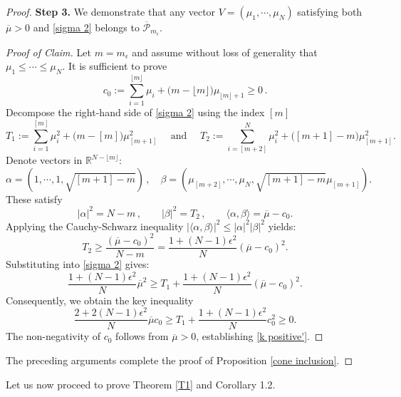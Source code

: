 \documentclass[12pt, twoside]{article}
\theoremstyle{definition}
\numberwithin{equation}{section}
\begin{document}
\begin{proof}
\noindent\textbf{Step 3.} We demonstrate that any vector $V = (\mu_{1}, \cdots, \mu_{N})$ satisfying both $\overline{\mu}>0$ and \eqref{sigma 2} belongs to $\overline{\mathcal{P}}_{m_{\epsilon}}$.
\begin{proof}[Proof of Claim]

Let $m = m_{\epsilon}$ and assume without loss of generality that $\mu_{1} \leq \cdots \leq \mu_{N}$. 
 It is sufficient to prove
\begin{equation}\label{k positive'}
c_{0}:=\sum_{i=1}^{\lfloor m \rfloor}\mu_{i}+\big(m-\lfloor m \rfloor\big)\mu_{\lfloor m \rfloor+1}\geq 0\,.
\end{equation}
Decompose the right-hand side of \eqref{sigma 2} using the index $[m]$
$$T_{1}:=\sum_{i=1}^{[m]}\mu_{i}^{2}+\big(m-[m]\big)\mu_{[m+1]}^{2} \quad \textrm{ and } \quad T_{2}:=\sum_{i=[m+2]}^{N}\mu_{i}^{2}+\big([m+1]-m\big)\mu_{[m+1]}^{2}.$$
Denote vectors in $\mathbb{R}^{N - \lfloor m \rfloor}$:
$$ \alpha=(1,\cdots,1,\sqrt{[m+1]-m})\,, \quad \beta=(\mu_{[m+2]}, \cdots, \mu_{N}, \sqrt{[m+1]-m}\mu_{[m+1]}).$$ 
These satisfy
$$|\alpha|^2=N-m\,, \qquad |\beta|^2=T_{2}\,, \qquad \langle \alpha,\beta\rangle=\overline{\mu}-c_{0}.$$
Applying the Cauchy-Schwarz inequality $|\langle \alpha,\beta\rangle|^{2}\leq |\alpha|^{2}|\beta|^{2}$ yields: 
$$T_{2}\geq \frac{(\overline{\mu}-c_{0})^{2}}{N-m}=\frac{1+(N-1)\epsilon^2}{N}(\overline{\mu}-c_{0})^{2}.$$
Substituting into \eqref{sigma 2} gives:
$$\frac{1+(N-1)\epsilon^2}{N}\overline{\mu}^{2}\geq T_{1}+\frac{1+(N-1)\epsilon^2}{N}(\overline{\mu}-c_{0})^{2}.$$
Consequently, we obtain the key inequality
\begin{equation}\label{E1}
\frac{2 + 2(N-1)\epsilon^2}{N}\overline{\mu}c_{0} \geq T_{1} + \frac{1 + (N-1)\epsilon^2}{N}c_{0}^{2} \geq 0.
\end{equation}
The non-negativity of $c_{0}$ follows from $\overline{\mu} > 0$, establishing \eqref{k positive'}. 
\end{proof}
The preceding arguments complete the proof of Proposition \ref{cone inclusion}.
\end{proof}
Let us now proceed to prove Theorem \ref{T1} and Corollary 1.2.
\end{document}
